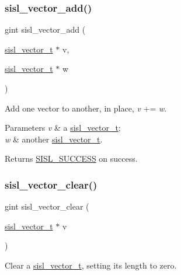 \subsubsection{\texorpdfstring{sisl\+\_\+vector\+\_\+add()}{sisl\_vector\_add()}}
{\footnotesize\ttfamily gint sisl\+\_\+vector\+\_\+add (\begin{DoxyParamCaption}\item[{\mbox{\hyperlink{group__vector_gacbac585492f5005f05f0c0b8463039be}{sisl\+\_\+vector\+\_\+t}} $\ast$}]{v,  }\item[{\mbox{\hyperlink{group__vector_gacbac585492f5005f05f0c0b8463039be}{sisl\+\_\+vector\+\_\+t}} $\ast$}]{w }\end{DoxyParamCaption})}

Add one vector to another, in place, {\itshape v} += {\itshape w}.


\begin{DoxyParams}{Parameters}
{\em v} & a \mbox{\hyperlink{group__vector_gacbac585492f5005f05f0c0b8463039be}{sisl\+\_\+vector\+\_\+t}}; \\
\hline
{\em w} & another \mbox{\hyperlink{group__vector_gacbac585492f5005f05f0c0b8463039be}{sisl\+\_\+vector\+\_\+t}}.\\
\hline
\end{DoxyParams}
\begin{DoxyReturn}{Returns}
\mbox{\hyperlink{group__status_gga82c112a16803c9ddebc065a1b0f16287a60b9f04752a2c4dd6214f8a4fd7d913b}{S\+I\+S\+L\+\_\+\+S\+U\+C\+C\+E\+SS}} on success. 
\end{DoxyReturn}
\mbox{\label{group__vector_gac61e04a39ddbc2f6c14ebba09787e7b3}} 
\subsubsection{\texorpdfstring{sisl\+\_\+vector\+\_\+clear()}{sisl\_vector\_clear()}}
{\footnotesize\ttfamily gint sisl\+\_\+vector\+\_\+clear (\begin{DoxyParamCaption}\item[{\mbox{\hyperlink{group__vector_gacbac585492f5005f05f0c0b8463039be}{sisl\+\_\+vector\+\_\+t}} $\ast$}]{v }\end{DoxyParamCaption})}

Clear a \mbox{\hyperlink{group__vector_gacbac585492f5005f05f0c0b8463039be}{sisl\+\_\+vector\+\_\+t}}, setting its length to zero.


